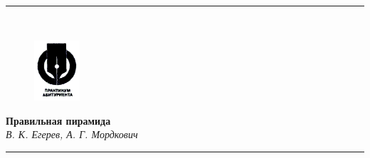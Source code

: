 \documentclass[a4paper,twoside]{article}
\begin{document}
\noindent\rule{16cm}{0.4pt}\vspace*{1cm}\\
\begin{figure}
\vspace*{-1.7cm}\hspace*{2cm}\includegraphics[width=0.15\textwidth]{l}
\end{figure}
\hspace*{1.5cm}\Huge\textbf{ Правильная пирамида}\\
\newline\vspace*{1cm}
\hspace*{1.5cm}\normalsize\textit{В. К. Егерев, А. Г. Мордкович}\\
\noindent\rule{16cm}{0.4pt}\\
\vspace*{-0.7cm}
\end{document}
